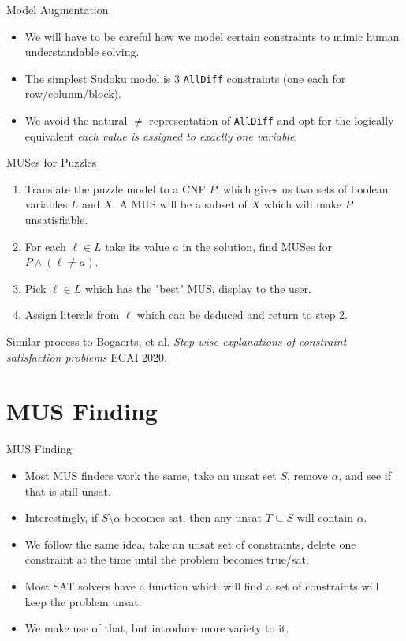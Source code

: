 \documentclass{beamer}
\begin{document}
\begin{frame}{Model Augmentation}
\begin{itemize}
    \item We will have to be careful how we model certain constraints to mimic human understandable solving.
    \item The simplest Sudoku model is 3 \texttt{AllDiff} constraints (one each for row/column/block).
    \item We avoid the natural $\neq$ representation of \texttt{AllDiff} and opt for the logically equivalent \emph{each value is assigned to exactly one variable}.
\end{itemize}
\end{frame}

\begin{frame}{MUSes for Puzzles}
\begin{enumerate}
    \item Translate the puzzle model to a CNF $P$, which gives us two sets of boolean variables $L$ and $X$. A MUS will be a subset of $X$ which will make $P$ unsatisfiable.
    \item For each $\ell \in L$ take its value $a$ in the solution, find MUSes for $P \land (\ell \neq a)$.
    \item Pick $\ell \in L$ which has the "best" MUS, display to the user.
    \item Assign literals from $\ell$  which can be deduced and return to step 2.
\end{enumerate}
Similar process to Bogaerts, et al. \emph{Step-wise explanations of constraint satisfaction problems} ECAI 2020.
\end{frame}

\section*{MUS Finding}
\begin{frame}{MUS Finding}
\begin{itemize}
    \item Most MUS finders work the same, take an unsat set $S$, remove $\alpha$, and see if that is still unsat.
    \item Interestingly, if $S\setminus \alpha$ becomes sat, then any unsat $T\subseteq S$ will contain $\alpha$.
    \item We follow the same idea, take an unsat set of constraints, delete one constraint at the time until the problem becomes true/sat.
    \item Most SAT solvers have a function which will find a set of constraints will keep the problem unsat.
    \item We make use of that, but introduce more variety to it.
\end{itemize}
\end{frame}
\end{document}
